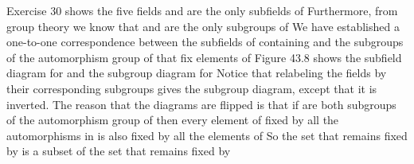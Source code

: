 \documentclass[11pt,oneside]{article}
\begin{document}
\begin{BookBody}
Exercise 30 shows the five fields  and  are the only subfields of  Furthermore, from group theory we know that  and \BookInline{\{\iota \}} are the only subgroups of  We have established a one-to-one correspondence between the subfields of  containing  and the subgroups of the automorphism group of  that fix elements of  Figure 43.8 shows the subfield diagram for  and the subgroup diagram for  Notice that relabeling the fields by their corresponding subgroups gives the subgroup diagram, except that it is inverted. The reason that the diagrams are flipped is that if  are both subgroups of the automorphism group of  then every element of  fixed by all the automorphisms in  is also fixed by all the elements of  So the set that remains fixed by  is a subset of the set that remains fixed by \BookEnd{\blacktriangle}

\end{BookBody}

\BookNarrativetrue
\end{document}
